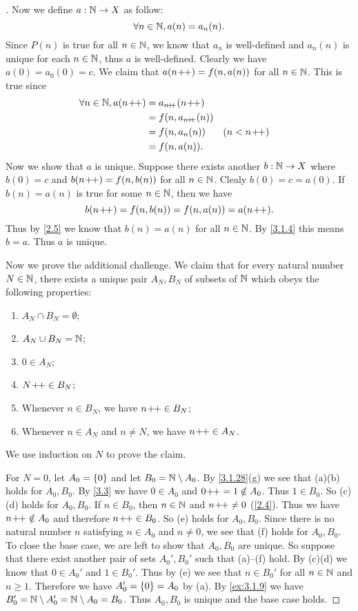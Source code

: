 \begin{proof}[]
	Now we define \(a : \mathbb{N} \to X\) as follow:
	\[
		\forall n \in \mathbb{N}, a(n) = a_n(n).
	\]
	Since \(P(n)\) is true for all \(n \in \mathbb{N}\), we know that \(a_n\) is well-defined and \(a_n(n)\) is unique for each \(n \in \mathbb{N}\), thus \(a\) is well-defined.
	Clearly we have \(a(0) = a_0(0) = c\).
	We claim that \(a(n\!+\!\!+) = f(n, a(n))\) for all \(n \in \mathbb{N}\).
	This is true since
	\begin{align*}
		\forall n \in \N, a(n\pp) & = a_{n\pp}(n\pp)                    \\
		                          & = f(n, a_{n\pp}(n))                 \\
		                          & = f(n, a_n(n))      &  & (n < n\pp) \\
		                          & = f(n, a(n)).
	\end{align*}
	Now we show that \(a\) is unique.
	Suppose there exists another \(b : \mathbb{N} \to X\) where \(b(0) = c\) and \(b(n\!+\!\!+) = f(n, b(n))\) for all \(n \in \mathbb{N}\).
	Clealy \(b(0) = c = a(0)\).
	If \(b(n) = a(n)\) is true for some \(n \in \mathbb{N}\), then we have
	\[
		b(n\!+\!\!+) = f(n, b(n)) = f(n, a(n)) = a(n\!+\!\!+).
	\]
	Thus by \cref{2.5} we know that \(b(n) = a(n)\) for all \(n \in \mathbb{N}\).
	By \cref{3.1.4} this means \(b = a\).
	Thus \(a\) is unique.

	Now we prove the additional challenge.
	We claim that for every natural number \(N \in \mathbb{N}\), there exists a unique pair \(A_N, B_N\) of subsets of \(\mathbb{N}\) which obeys the following properties:
	\begin{enumerate}
		\item \(A_N \cap B_N = \emptyset\);
		\item \(A_N \cup B_N = \mathbb{N}\);
		\item \(0 \in A_N\);
		\item \(N\!+\!\!+ \in B_N\);
		\item Whenever \(n \in B_N\), we have \(n\!+\!\!+ \in B_N\);
		\item Whenever \(n \in A_N\) and \(n \neq N\), we have \(n\!+\!\!+ \in A_N\).
	\end{enumerate}
	We use induction on \(N\) to prove the claim.

	For \(N = 0\), let \(A_0 = \left\lbrace0\right\rbrace\) and let \(B_0 = \mathbb{N} \setminus A_0\).
	By \cref{3.1.28}(g) we see that (a)(b) holds for \(A_0, B_0\).
	By \cref{3.3} we have \(0 \in A_0\) and \(0\!+\!\!+ = 1 \notin A_0\).
	Thus \(1 \in B_0\).
	So (c)(d) holds for \(A_0, B_0\).
	If \(n \in B_0\), then \(n \in \mathbb{N}\) and \(n\!+\!\!+ \neq 0\) (\cref{2.4}).
	Thus we have \(n\!+\!\!+ \notin A_0\) and therefore \(n\!+\!\!+ \in B_0\).
	So (e) holds for \(A_0, B_0\).
	Since there is no natural number \(n\) satisfying \(n \in A_0\) and \(n \neq 0\), we see that (f) holds for \(A_0, B_0\).
	To close the base case, we are left to show that \(A_0, B_0\) are unique.
	So suppose that there exist another pair of sets \(A_0', B_0'\) such that (a)--(f) hold.
	By (c)(d) we know that \(0 \in A_0'\) and \(1 \in B_0'\).
	Thus by (e) we see that \(n \in B_0'\) for all \(n \in \mathbb{N}\) and \(n \geq 1\).
	Therefore we have \(A_0' = \left\lbrace0\right\rbrace = A_0\) by (a).
	By \cref{ex:3.1.9} we have \(B_0' = \mathbb{N} \setminus A_0' = \mathbb{N} \setminus A_0 = B_0\).
	Thus \(A_0, B_0\) is unique and the base case holds.


\end{proof}
